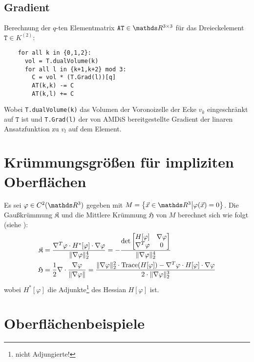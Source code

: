   \subsection{Gradient}
    \label{subsecAlgoGradient}
    Berechnung der \( q \)-ten Elementmatrix \( \mathtt{AT}\in\R^{3\times 3} \) für das Dreieckelement
    \( \mathtt{T}\in K^{(2)} \):
    \begin{verbatim}
    for all k in {0,1,2}:
      vol = T.dualVolume(k)
      for all l in {k+1,k+2} mod 3:
        C = vol * (T.Grad(l))[q]
        AT(k,k) -= C
        AT(k,l) += C
    \end{verbatim}
    Wobei \texttt{T.dualVolume(k)} das Volumen der Voronoizelle der Ecke \( v_{k} \) eingeschränkt auf \(
   \mathtt{T} \) ist und \texttt{T.Grad(l)} der von AMDiS bereitgestellte Gradient der linaren Ansatzfunktion zu \( v_{l} \)
   auf dem Element.

\section{Krümmungsgrößen für impliziten Oberflächen}

  Es sei \( \varphi\in C^{2}(\R^{3}) \) gegeben mit \( M = \left\{ \vec{x}\in\R^{3} \middle| \varphi(\vec{x}) = 0 \right\} \).
  Die Gaußkrümmung \( \mathfrak{K} \) und die Mittlere Krümmung \( \mathfrak{H} \) von \( M \) berechnet sich wie folgt (siehe \cite{CurvatureFormulas}):
  \begin{align}
    \mathfrak{K} &= \frac{\nabla^{T}\varphi \cdot H^{*}[\varphi] \cdot \nabla\varphi}{ \|\nabla\varphi\|_{2}^{4}}
                 = - \frac{\det \begin{bmatrix} H[\varphi] & \nabla\varphi \\ \nabla^{T}\varphi & 0 \end{bmatrix}}{\|\nabla\varphi\|_{2}^{4}} \\
    \mathfrak{H} &= \frac{1}{2}\nabla \cdot \frac{\nabla\varphi}{\|\nabla\varphi\|}
          = \frac{\|\nabla\varphi\|_{2}^{2}\cdot\text{Trace}(H[\varphi]) - \nabla^{T}\varphi \cdot H[\varphi] \cdot \nabla\varphi }
                        {2\cdot\|\nabla\varphi\|_{2}^{3}}
  \end{align}
  wobei \( H^{*}[\varphi] \) die Adjunkte\footnote{nicht Adjungierte!} des Hessian \( H[\varphi] \) ist.


\section{Oberflächenbeispiele}

